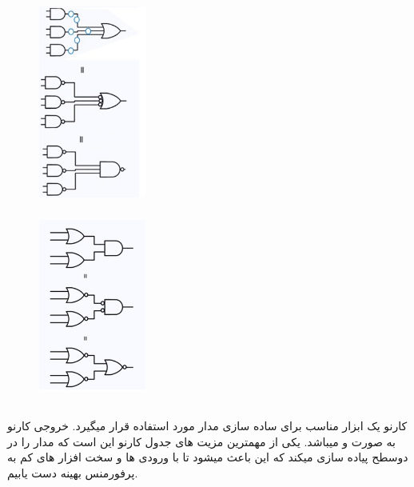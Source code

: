 \documentclass[20pt, a4paper]{article}
\begin{document}
\subsubsection{}
\begin{figure}[htbp]\centering
	\centerline{\includegraphics[width=100pt]{img/analyze/mO1.jpg}}
\end{figure}

\subsubsection{}
\begin{figure}[htbp]\centering
	\centerline{\includegraphics[width=100pt]{img/analyze/mO2.jpg}}
\end{figure}

\newpage

\subsection{}
کارنو یک ابزار مناسب برای ساده سازی مدار مورد استفاده قرار میگیرد.
خروجی کارنو به صورت 
و
میباشد.
یکی  از مهمترین مزیت های جدول کارنو این است که مدار را در دوسطح پیاده سازی میکند که این باعث میشود
تا با ورودی ها و سخت افزار های کم به پرفورمنس بهینه دست یابیم.
\end{document}
